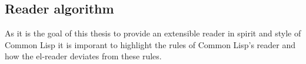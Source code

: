 \documentclass[a4paper,10pt,twoside]{article}
\newcommand{\el}{Emacs Lisp}
\newcommand{\cl}{Common Lisp}
\newcommand{\elr}{el-reader}
\newcommand{\emacs}{GNU~Emacs}
\begin{document}







\subsection{Reader algorithm}
\label{subsec:read-algo}

As it is the goal of this thesis to provide an extensible reader in spirit and
style of \cl{} it is imporant to highlight the rules of \cl{}’s reader and how
the \elr{} deviates from these rules.
\end{document}

